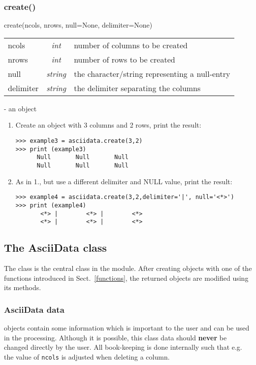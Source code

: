 \subsubsection{create()}
\label{functions_create}

create(ncols, nrows, null=None, delimiter=None)

\begin{tabular}{lcl}
ncols    &{\it int}& number of columns to be created\\
nrows    &{\it int}& number of rows to be created\\
null     &{\it string}& the character/string representing a null-entry\\
delimiter&{\it string}& the delimiter separating the columns \\
\end{tabular}

- an \ad object

\begin{enumerate}
\item Create an \ad object with 3 columns and 2 rows, print the result:
\begin{verbatim}
>>> example3 = asciidata.create(3,2)
>>> print (example3)
      Null       Null       Null
      Null       Null       Null
\end{verbatim}

\item As in 1., but use a different delimiter and NULL value, print the result:
\begin{verbatim}
>>> example4 = asciidata.create(3,2,delimiter='|', null='<*>')
>>> print (example4)
       <*> |        <*> |        <*>
       <*> |        <*> |        <*>
\end{verbatim}
\end{enumerate}

%
%
\subsection{The AsciiData class}
\label{adclass}
The \ad class is the central class in the \AAD module.
After creating \ad objects with one of the functions introduced in
Sect.\ \ref{functions}, the returned objects are modified using
its methods.

\subsubsection{AsciiData data}
\label{add}
\ad objects contain some information which is important to the user
and can be used in the processing. Although it is possible,
this class data should {\bf never} be changed directly by the user.
All book-keeping is done internally such that e.g. the value of
{\tt ncols} is adjusted when deleting a column.

